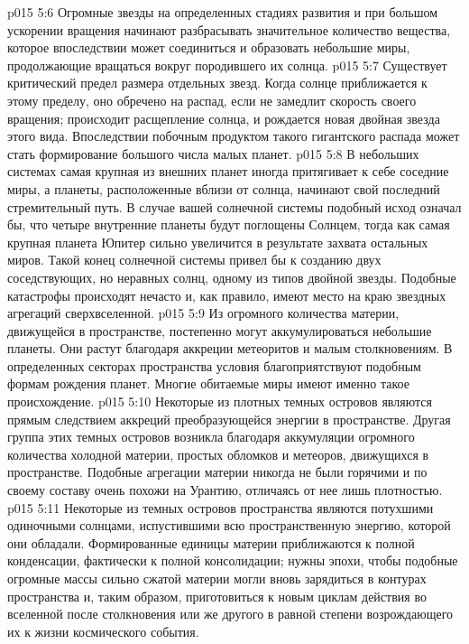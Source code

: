 \vs p015 5:6 \pc {}\bibnobreakspace {} Огромные звезды на определенных стадиях развития и при большом ускорении вращения начинают разбрасывать значительное количество вещества, которое впоследствии может соединиться и образовать небольшие миры, продолжающие вращаться вокруг породившего их солнца.
\vs p015 5:7 \pc {}\bibnobreakspace {} Существует критический предел размера отдельных звезд. Когда солнце приближается к этому пределу, оно обречено на распад, если не замедлит скорость своего вращения; происходит расщепление солнца, и рождается новая двойная звезда этого вида. Впоследствии побочным продуктом такого гигантского распада может стать формирование большого числа малых планет.
\vs p015 5:8 \pc {}\bibnobreakspace {} В небольших системах самая крупная из внешних планет иногда притягивает к себе соседние миры, а планеты, расположенные вблизи от солнца, начинают свой последний стремительный путь. В случае вашей солнечной системы подобный исход означал бы, что четыре внутренние планеты будут поглощены Солнцем, тогда как самая крупная планета Юпитер сильно увеличится в результате захвата остальных миров. Такой конец солнечной системы привел бы к созданию двух соседствующих, но неравных солнц, одному из типов двойной звезды. Подобные катастрофы происходят нечасто и, как правило, имеют место на краю звездных агрегаций сверхвселенной.
\vs p015 5:9 \pc {}\bibnobreakspace {} Из огромного количества материи, движущейся в пространстве, постепенно могут аккумулироваться небольшие планеты. Они растут благодаря аккреции метеоритов и малым столкновениям. В определенных секторах пространства условия благоприятствуют подобным формам рождения планет. Многие обитаемые миры имеют именно такое происхождение.
\vs p015 5:10 Некоторые из плотных темных островов являются прямым следствием аккреций преобразующейся энергии в пространстве. Другая группа этих темных островов возникла благодаря аккумуляции огромного количества холодной материи, простых обломков и метеоров, движущихся в пространстве. Подобные агрегации материи никогда не были горячими и по своему составу очень похожи на Урантию, отличаясь от нее лишь плотностью.
\vs p015 5:11 \pc {}\bibnobreakspace {} Некоторые из темных островов пространства являются потухшими одиночными солнцами, испустившими всю пространственную энергию, которой они обладали. Формированные единицы материи приближаются к полной конденсации, фактически к полной консолидации; нужны эпохи, чтобы подобные огромные массы сильно сжатой материи могли вновь зарядиться в контурах пространства и, таким образом, приготовиться к новым циклам действия во вселенной после столкновения или же другого в равной степени возрождающего их к жизни космического события.
